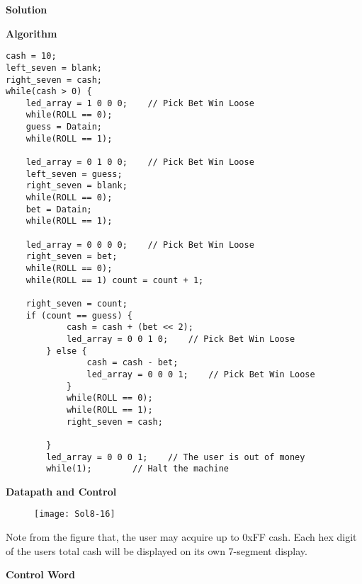 \begin{enumerate}
        \begin{onlysolution}[fragile]  \textbf{Solution}

            \textbf{ Algorithm}
              \begin{verbatim}
cash = 10;
left_seven = blank;
right_seven = cash;
while(cash > 0) {
    led_array = 1 0 0 0;    // Pick Bet Win Loose
    while(ROLL == 0);
    guess = Datain;
    while(ROLL == 1);

    led_array = 0 1 0 0;    // Pick Bet Win Loose
    left_seven = guess;
    right_seven = blank;
    while(ROLL == 0);
    bet = Datain;
    while(ROLL == 1);

    led_array = 0 0 0 0;    // Pick Bet Win Loose
    right_seven = bet;
    while(ROLL == 0);
    while(ROLL == 1) count = count + 1;

    right_seven = count;
    if (count == guess) {
            cash = cash + (bet << 2);
            led_array = 0 0 1 0;    // Pick Bet Win Loose
        } else {
                cash = cash - bet;
                led_array = 0 0 0 1;    // Pick Bet Win Loose
            }
            while(ROLL == 0);
            while(ROLL == 1);
            right_seven = cash;

        }
        led_array = 0 0 0 1;    // The user is out of money
        while(1);        // Halt the machine
\end{verbatim}
            \textbf{ Datapath and Control}

            \begin{figure}[ht]
                \texttt{[image: Sol8-16]}
            \end{figure}
            \filbreak
            Note from the figure that, the user may acquire
            up to 0xFF cash.  Each hex digit of the users total cash will
            be displayed on its own 7-segment display.

            \textbf{ Control Word}


\end{onlysolution}
\end{enumerate}
